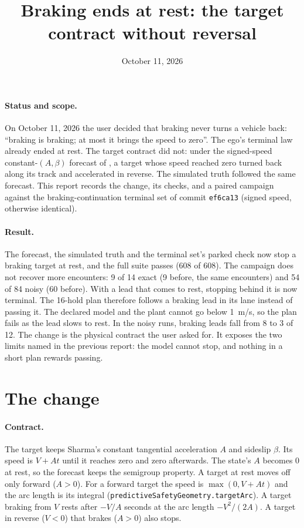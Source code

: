 \documentclass[11pt]{article}
\title{Braking ends at rest: the target contract without reversal}
\author{}
\date{October 11, 2026}
\begin{document}
\maketitle
\paragraph{Status and scope.}
On October 11, 2026 the user decided that braking never turns a vehicle back:
``braking is braking; at most it brings the speed to zero''. The ego's
terminal law already ended at rest. The target contract did not: under the
signed-speed constant-$(A,\beta)$ forecast of
, a target whose speed reached
zero turned back along its track and accelerated in reverse. The simulated
truth followed the same forecast. This report records the change, its
checks, and a paired campaign against the braking-continuation terminal set
of commit \texttt{ef6ca13} (signed speed, otherwise identical).

\paragraph{Result.}
The forecast, the simulated truth and the terminal set's parked check now
stop a braking target at rest, and the full suite passes (608 of 608). The
campaign does not recover more encounters: 9 of 14 exact (9 before, the same
encounters) and 54 of 84 noisy (60 before). With a lead that comes to rest,
stopping behind it is now terminal. The 16-hold plan therefore follows a
braking lead in its lane instead of passing it. The declared model and the
plant cannot go below 1~m/s, so the plan fails as the lead slows to rest. In
the noisy runs, braking leads fall from 8 to 3 of 12. The change is the
physical contract the user asked for. It exposes the two limits named in the
previous report: the model cannot stop, and nothing in a short plan rewards
passing.

\section{The change}
\paragraph{Contract.}
The target keeps Sharma's constant tangential acceleration $A$ and sideslip
$\beta$. Its speed is $V+At$ until it reaches zero and zero afterwards. The
state's $A$ becomes 0 at rest, so the forecast keeps the semigroup property.
A target at rest moves off only forward ($A>0$). For a forward target the
speed is $\max(0,V+At)$ and the arc length is its integral
(\texttt{predictiveSafetyGeometry.targetArc}). A target braking from $V$
rests after $-V/A$ seconds at the arc length $-V^2/(2A)$. A target in reverse
($V<0$) that brakes ($A>0$) also stops.
\end{document}

